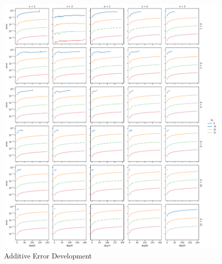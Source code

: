 \begin{figure}[htp]
  \centering
  \includegraphics[scale=0.4]{images/AddErrorDevelopment.png}
  \caption[Additive Error Development]{Additive Error Development}
  \label{fig:AddErrorDev}
\end{figure}

